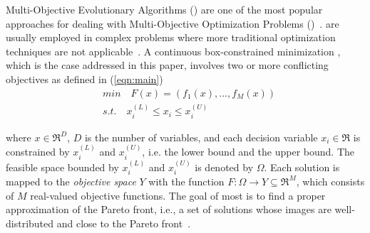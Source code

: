 Multi-Objective Evolutionary Algorithms (\MOEAS{}) are one of the most popular approaches 
for dealing with Multi-Objective Optimization Problems (\MOPS{})~\cite{das2011real, zhou2011multiobjective}.
%
\MOEAS{} are usually employed in complex problems where more traditional optimization techniques are not 
applicable~\cite{Lootsma:99}.
%
A continuous box-constrained minimization \MOP{}, which is the case addressed in this paper,
involves two or more conflicting objectives as defined in (\ref{eqn:main})
%
\begin{equation}\label{eqn:main}
\begin{split}
&min \quad F(x) = (f_1(x), ..., f_M(x)) \\
&s.t. \quad x_i^{(L)} \leq x_i \leq x_i^{(U)}
\end{split}
\end{equation}

where $x \in \Re^D$, $D$ is the number of variables,
and each decision variable $x_i \in \Re$ is constrained by $x_i^{(L)}$ and $x_i^{(U)}$, 
i.e. the lower bound and the upper bound.
The feasible space bounded by $x_i^{(L)}$ and $x_i^{(U)}$ is denoted by $\Omega$.
Each solution is mapped to the \textit{objective space} $Y$ with the function $F: \Omega \rightarrow Y \subseteq \Re^M$, 
which consists of $M$ real-valued objective functions.
%
%
%
%
%
%
The goal of most \MOEAS{} is to find a proper approximation of the Pareto front, i.e., a set of
solutions whose images are well-distributed and close to the Pareto front~\cite{trivedi2016survey}.
%

